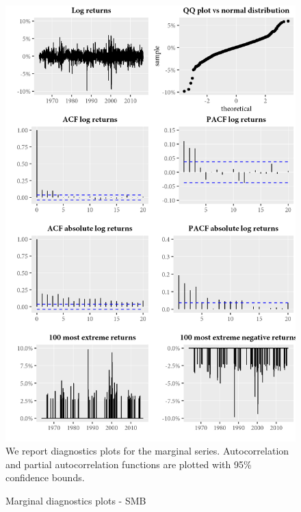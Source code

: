 \begin{figure}[H]
  \caption{Marginal diagnostics plots - SMB}
  \label{diag:marginaldiagSMB}
  \toprule
  \centering
  \begin{minipage}{\textwidth}
  \includegraphics[scale=1]{graphics/marginal/MarginalStats.SMB.Estim.png}  
  \bottomrule
  \vspace{3mm}
  \footnotesize
  We report diagnostics plots for the marginal series. Autocorrelation and partial autocorrelation functions are plotted with 95\% confidence bounds. 
  \end{minipage}
\end{figure}
